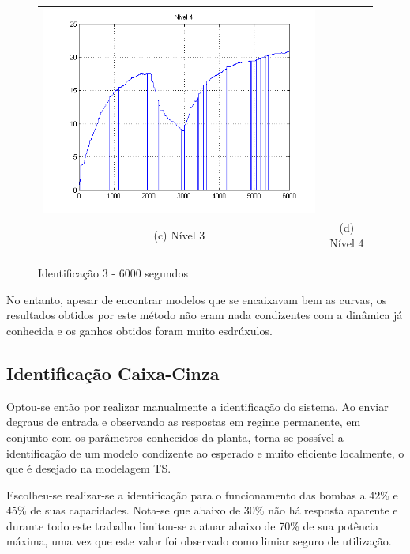 \begin{figure}[H]
\begin{tabular}{cc}
		\includegraphics[height=0.15\paperheight,keepaspectratio]{img/sim3_h4.png} \\
		(c) Nível 3 &
		(d) Nível 4
	\end{tabular}
	\caption{\label{imgID_6000} Identificação 3 - 6000 segundos}
\end{figure}

No entanto, apesar de encontrar modelos que se encaixavam bem as curvas, os resultados obtidos por este método não eram nada condizentes com a dinâmica já conhecida e os ganhos obtidos foram muito esdrúxulos.

\subsection{Identificação Caixa-Cinza}

Optou-se então por realizar manualmente a identificação do sistema. Ao enviar degraus de entrada e observando as respostas em regime permanente, em conjunto com os parâmetros conhecidos da planta, torna-se possível a identificação de um modelo condizente ao esperado e muito eficiente localmente, o que é desejado na modelagem TS.

Escolheu-se realizar-se a identificação para o funcionamento das bombas a 42\% e 45\% de suas capacidades. Nota-se que abaixo de 30\% não há resposta aparente e durante todo este trabalho limitou-se a atuar abaixo de 70\% de sua potência máxima, uma vez que este valor foi observado como limiar seguro de utilização.

\begin{table}[!ht]
	\caption{Tensões Escolhidas}
	\label{tabIdentKs}
	\small
	\centering
\end{table}

